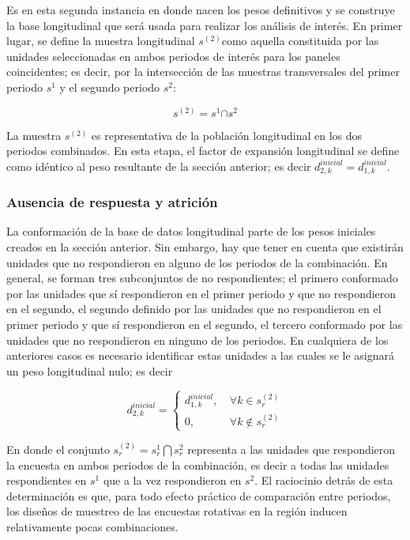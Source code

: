\documentclass[
  12pt,
]{book}
\begin{document}
Es en esta segunda instancia en donde nacen los pesos definitivos y se construye la base longitudinal que será usada para realizar los análisis de interés. En primer lugar, se define la muestra longitudinal \(s^{(2)}\)como aquella constituida por las unidades seleccionadas en ambos periodos de interés para los paneles coincidentes; es decir, por la intersección de las muestras transversales del primer periodo \(s^1\) y el segundo periodo \(s^2\):

\[
s^{(2)} = s^1 \boldsymbol\cap s^2
\]

La muestra \(s^{(2)}\) es representativa de la población longitudinal en los dos periodos combinados. En esta etapa, el factor de expansión longitudinal se define como idéntico al peso resultante de la sección anterior; es decir \(d_{2, k}^{inicial} = d_{1, k}^{inicial}\).

\hypertarget{ausencia-de-respuesta-y-atriciuxf3n}{%
\subsubsection{Ausencia de respuesta y atrición}\label{ausencia-de-respuesta-y-atriciuxf3n}}

La conformación de la base de datos longitudinal parte de los pesos iniciales creados en la sección anterior. Sin embargo, hay que tener en cuenta que existirán unidades que no respondieron en alguno de los periodos de la combinación. En general, se forman tres subconjuntos de no respondientes; el primero conformado por las unidades que sí respondieron en el primer periodo y que no respondieron en el segundo, el segundo definido por las unidades que no respondieron en el primer periodo y que sí respondieron en el segundo, el tercero conformado por las unidades que no respondieron en ninguno de los periodos. En cualquiera de los anteriores casos es necesario identificar estas unidades a las cuales se le asignará un peso longitudinal nulo; es decir

\begin{equation*}
d_{2, k}^{inicial} =
\begin{cases}
d_{1, k}^{inicial}, &\ \forall k \in s_r^{(2)}  \\
0, &\ \forall k \notin s_r^{(2)}
\end{cases}
\end{equation*}

En donde el conjunto \(s_r^{(2)} = s_r^1 \boldsymbol\bigcap s_r^2\) representa a las unidades que respondieron la encuesta en ambos periodos de la combinación, es decir a todas las unidades respondientes en \(s^1\) que a la vez respondieron en \(s^2\). El raciocinio detrás de esta determinación es que, para todo efecto práctico de comparación entre periodos, los diseños de muestreo de las encuestas rotativas en la región inducen relativamente pocas combinaciones.
\end{document}

